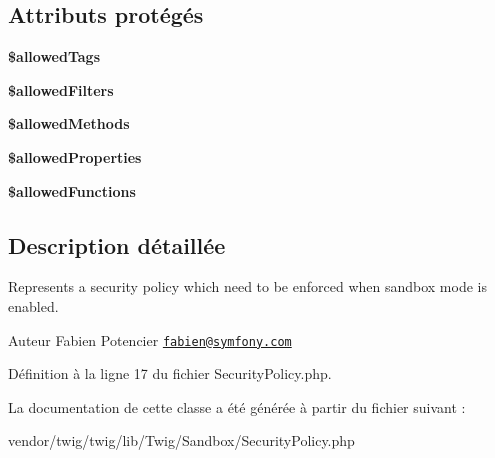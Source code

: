 \subsection*{Attributs protégés}
\begin{DoxyCompactItemize}
\item 
{\bfseries \$allowed\+Tags}\hypertarget{class_twig___sandbox___security_policy_a6698925f702315b0cf824a8edec00cb0}{}\label{class_twig___sandbox___security_policy_a6698925f702315b0cf824a8edec00cb0}

\item 
{\bfseries \$allowed\+Filters}\hypertarget{class_twig___sandbox___security_policy_a9ade06c5df1d0cd5cec2deac61093e99}{}\label{class_twig___sandbox___security_policy_a9ade06c5df1d0cd5cec2deac61093e99}

\item 
{\bfseries \$allowed\+Methods}\hypertarget{class_twig___sandbox___security_policy_ab278eba7cab5341dacdccecd7a2cc2df}{}\label{class_twig___sandbox___security_policy_ab278eba7cab5341dacdccecd7a2cc2df}

\item 
{\bfseries \$allowed\+Properties}\hypertarget{class_twig___sandbox___security_policy_af097fa346e31c5a6718eb792e966980b}{}\label{class_twig___sandbox___security_policy_af097fa346e31c5a6718eb792e966980b}

\item 
{\bfseries \$allowed\+Functions}\hypertarget{class_twig___sandbox___security_policy_ac1d7a89bbd6e44a7c9908b684055481f}{}\label{class_twig___sandbox___security_policy_ac1d7a89bbd6e44a7c9908b684055481f}

\end{DoxyCompactItemize}


\subsection{Description détaillée}
Represents a security policy which need to be enforced when sandbox mode is enabled.

\begin{DoxyAuthor}{Auteur}
Fabien Potencier \href{mailto:fabien@symfony.com}{\tt fabien@symfony.\+com} 
\end{DoxyAuthor}


Définition à la ligne 17 du fichier Security\+Policy.\+php.



La documentation de cette classe a été générée à partir du fichier suivant \+:\begin{DoxyCompactItemize}
\item 
vendor/twig/twig/lib/\+Twig/\+Sandbox/Security\+Policy.\+php\end{DoxyCompactItemize}
